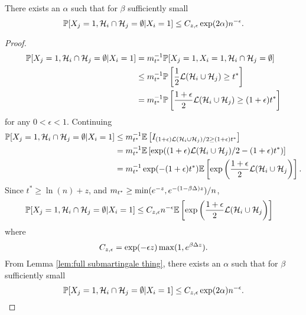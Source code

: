 \begin{lemma}
	\label{lem: prob X_j and no intersect given X_i = 1}
	There exists an $\alpha$ such that for $\beta$ sufficiently small
	\begin{equation}
		\mathbb{P}[X_j = 1, \mathcal{H}_i \cap \mathcal{H}_j = \emptyset| X_i = 1] \leq C_{z, \epsilon} \exp(2 \alpha) n^{-\epsilon}.
	\end{equation}
\end{lemma}
\begin{proof}
	\begin{align}
		\mathbb{P}[X_j = 1, \mathcal{H}_i \cap \mathcal{H}_j = \emptyset| X_i = 1] &= m_{t^*}^{-1} \mathbb{P}[X_j = 1, X_i = 1, \mathcal{H}_i \cap \mathcal{H}_j = \emptyset]\\
		&\leq m_{t^*}^{-1} \mathbb{P}\left[\frac{1}{2} \mathcal{L}(\mathcal{H}_i \cup \mathcal{H}_j) \geq t^*\right]\\
		&= m_{t^*}^{-1} \mathbb{P}\left[\frac{1+\epsilon}{2} \mathcal{L}(\mathcal{H}_i \cup \mathcal{H}_j) \geq (1+\epsilon) t^*\right]
	\end{align}
	for any $0 < \epsilon < 1$. Continuing
	\begin{align}
		\mathbb{P}[X_j = 1, \mathcal{H}_i \cap \mathcal{H}_j = \emptyset| X_i = 1] &\leq m_{t^*}^{-1} \mathbb{E}\left[I_{(1+\epsilon)\mathcal{L}(\mathcal{H}_i \cup \mathcal{H}_j)/2 \geq (1+\epsilon)t^*}\right]\\
		&= m_{t^*}^{-1} \mathbb{E}\left[\exp((1+\epsilon)\mathcal{L}(\mathcal{H}_i \cup \mathcal{H}_j)/2 - (1+\epsilon)t^*)\right]\\
		&= m_{t^*}^{-1} \exp(-(1+\epsilon)t^*) \mathbb{E}\left[\exp\left(\frac{1+\epsilon}{2}\mathcal{L}(\mathcal{H}_i \cup \mathcal{H}_j\right)\right].
	\end{align}
	Since $t^* \geq \ln(n) + z$, and $m_{t^*} \geq \min(e^{-z}, e^{-(1 - \beta\Delta)z})/n$,
	\begin{align}
		\mathbb{P}[X_j = 1, \mathcal{H}_i \cap \mathcal{H}_j = \emptyset| X_i = 1] &\leq C_{z, \epsilon} n^{-\epsilon} \mathbb{E}\left[\exp\left(\frac{1+\epsilon}{2}\mathcal{L}(\mathcal{H}_i \cup \mathcal{H}_j\right)\right]
	\end{align}
	where 
	\begin{equation}
		C_{z, \epsilon} = \exp(-\epsilon z) \max(1, e^{\beta\Delta z}).
	\end{equation}
	From Lemma \ref{lem:full submartingale thing}, there exists an $\alpha$ such that for $\beta$ sufficiently small
	\begin{equation}
		\mathbb{P}[X_j = 1, \mathcal{H}_i \cap \mathcal{H}_j = \emptyset| X_i = 1] \leq C_{z, \epsilon} \exp(2 \alpha) n^{-\epsilon}.
	\end{equation}
\end{proof}

